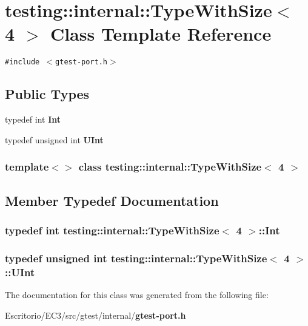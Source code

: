\section{testing::internal::TypeWithSize$<$ 4 $>$ Class Template Reference}
\label{classtesting_1_1internal_1_1TypeWithSize_3_014_01_4}
{\tt \#include $<$gtest-port.h$>$}

\subsection*{Public Types}
\begin{CompactItemize}
\item 
typedef int {\bf Int}
\item 
typedef unsigned int {\bf UInt}
\end{CompactItemize}
\subsubsection*{template$<$$>$ class testing::internal::TypeWithSize$<$ 4 $>$}



\subsection{Member Typedef Documentation}
\subsubsection{\setlength{\rightskip}{0pt plus 5cm}typedef int {\bf testing::internal::TypeWithSize}$<$ 4 $>$::{\bf Int}}\label{classtesting_1_1internal_1_1TypeWithSize_3_014_01_4_fd38548a58e66083a93f7c31d7f81cf5}


\subsubsection{\setlength{\rightskip}{0pt plus 5cm}typedef unsigned int {\bf testing::internal::TypeWithSize}$<$ 4 $>$::{\bf UInt}}\label{classtesting_1_1internal_1_1TypeWithSize_3_014_01_4_f553cbff413a7e2072a7874b7f5db8d0}




The documentation for this class was generated from the following file:\begin{CompactItemize}
\item 
Escritorio/EC3/src/gtest/internal/{\bf gtest-port.h}\end{CompactItemize}
